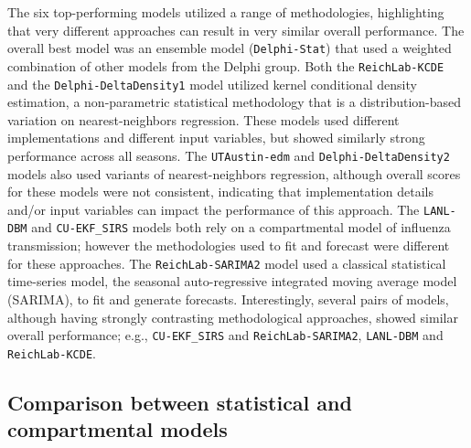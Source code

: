 \documentclass[9pt,twocolumn,twoside]{pnas-new}\usepackage[]{graphicx}\usepackage[]{color}
\begin{document}
The six top-performing models utilized a range of methodologies, highlighting that very different approaches can result in very similar overall performance. 
The overall best model was an ensemble model ({\tt Delphi-Stat}) that used a weighted combination of other models from the Delphi group.
Both the {\tt ReichLab-KCDE} and the {\tt Delphi-DeltaDensity1} model utilized kernel conditional density estimation, a non-parametric statistical methodology that is a distribution-based variation on nearest-neighbors regression. 
These models used different implementations and different input variables, but showed similarly strong performance across all seasons.
The {\tt UTAustin-edm} and {\tt Delphi-DeltaDensity2} models also used variants of nearest-neighbors regression, although overall scores for these models were not consistent, indicating that implementation details and/or input variables can impact the performance of this approach.
The {\tt LANL-DBM} and {\tt CU-EKF\_SIRS} models both rely on a compartmental model of influenza transmission; however the methodologies used to fit and forecast were different for these approaches.
The {\tt ReichLab-SARIMA2} model used a classical statistical time-series model, the seasonal auto-regressive integrated moving average model (SARIMA), to fit and generate forecasts. 
Interestingly, several pairs of models, although having strongly contrasting methodological approaches, showed similar overall performance; e.g., {\tt CU-EKF\_SIRS} and {\tt ReichLab-SARIMA2}, {\tt LANL-DBM} and {\tt ReichLab-KCDE}.


\subsection*{Comparison between statistical and compartmental models} \label{sec:stat-mech}
\end{document}
